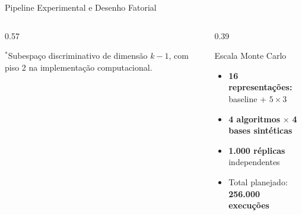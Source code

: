 \documentclass[aspectratio=169,11pt]{beamer}
\begin{document}
\begin{frame}{Pipeline Experimental e Desenho Fatorial}
  \vspace{0.55em}
  \begin{columns}[T,onlytextwidth]
    \begin{column}{0.57\textwidth}
      \centering
      \setlength{\tabcolsep}{4pt}
      \par\vspace{0.35em}
      {\scriptsize\textcolor{ufmggray}{$^*$Subespaço discriminativo de dimensão $k-1$, com piso 2 na implementação computacional.}}
    \end{column}
    \begin{column}{0.39\textwidth}
      \begin{alertblock}{Escala Monte Carlo}
        \footnotesize
        \begin{itemize}
          \item \textbf{16 representações:} baseline + $5 \times 3$
          \item \textbf{4 algoritmos} $\times$ \textbf{4 bases sintéticas}
          \item \textbf{1{.}000 réplicas} independentes
          \item Total planejado: \textbf{256{.}000 execuções}
        \end{itemize}
      \end{alertblock}
    \end{column}
  \end{columns}
\end{frame}
\end{document}
